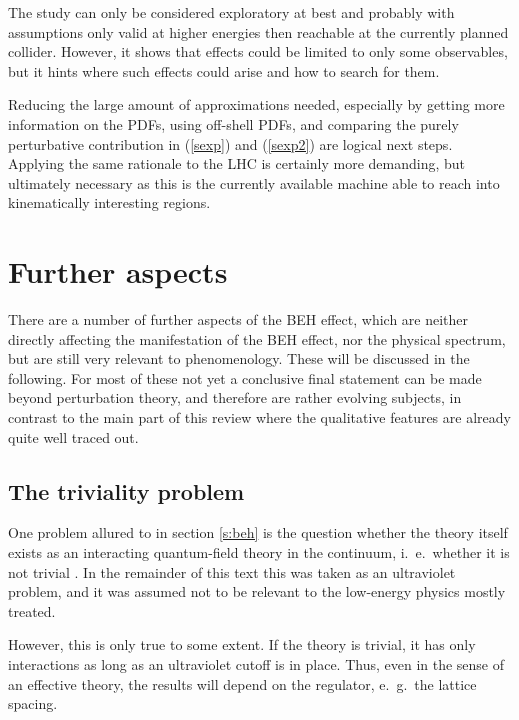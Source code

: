 \documentclass[final,12pt,3p,longtitle]{elsarticle}
\newcommand*{\pref}[1]{(\ref{#1})}
\newcommand*{\1}{1\!\!\!\bot}
\begin{document}
The study can only be considered exploratory at best and probably with assumptions only valid at higher energies then reachable at the currently planned collider. However, it shows that effects could be limited to only some observables, but it hints where such effects could arise and how to search for them.

Reducing the large amount of approximations needed, especially by getting more information on the PDFs, using off-shell PDFs, and comparing the purely perturbative contribution in \pref{sexp} and \pref{sexp2} are logical next steps. Applying the same rationale to the LHC is certainly more demanding, but ultimately necessary as this is the currently available machine able to reach into kinematically interesting regions.

\section{Further aspects}\label{s:further}

There are a number of further aspects of the BEH effect, which are neither directly affecting the manifestation of the BEH effect, nor the physical spectrum, but are still very relevant to phenomenology. These will be discussed in the following. For most of these not yet a conclusive final statement can be made beyond perturbation theory, and therefore are rather evolving subjects, in contrast to the main part of this review where the qualitative features are already quite well traced out.

\subsection{The triviality problem}\label{ss:triv}

One problem allured to in section \ref{s:beh} is the question whether the theory itself exists as an interacting quantum-field theory in the continuum, i.\ e.\ whether it is not trivial \cite{Callaway:1988ya}. In the remainder of this text this was taken as an ultraviolet problem, and it was assumed not to be relevant to the low-energy physics mostly treated.

However, this is only true to some extent. If the theory is trivial, it has only interactions as long as an ultraviolet cutoff is in place. Thus, even in the sense of an effective theory, the results will depend on the regulator, e.\ g.\ the lattice spacing.
\end{document}

